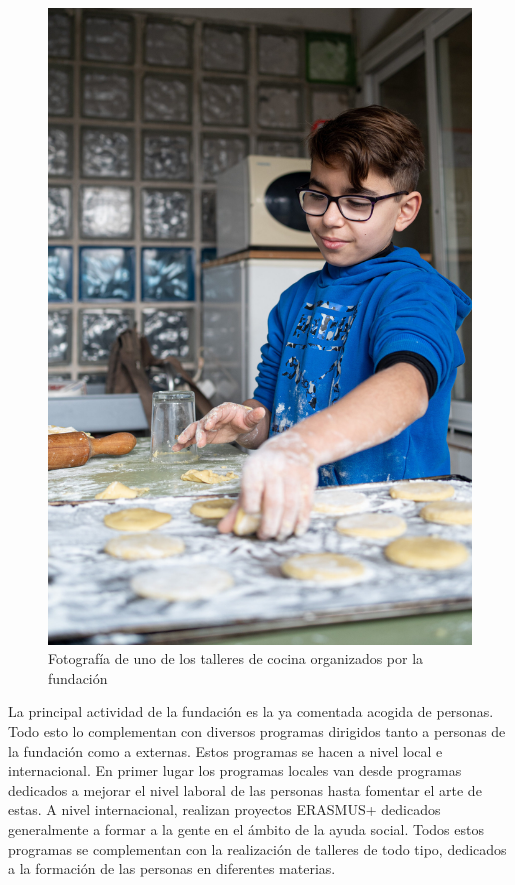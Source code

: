 \begin{figure}
    \centering
    \includegraphics[width=0.9\linewidth]{imagenes/fes/taller2.jpg}
    \caption{Fotografía de uno de los talleres de cocina organizados por la fundación}
\end{figure}

La principal actividad de la fundación es la ya comentada acogida de personas. Todo esto lo complementan con diversos programas dirigidos tanto a personas de la fundación como a externas. Estos programas se hacen a nivel local e internacional. En primer lugar los programas locales van desde programas dedicados a mejorar el nivel laboral de las personas hasta fomentar el arte de estas. A nivel internacional, realizan proyectos ERASMUS+ dedicados generalmente a formar a la gente en el ámbito de la ayuda social. Todos estos programas se complementan con la realización de talleres de todo tipo, dedicados a la formación de las personas en diferentes materias.